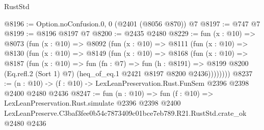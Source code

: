 \begin{lexlean}{RustStd}
\begin{coremodule}
@8196 := Option.noConfusion.{0, 0} (@2401 (@8056 @870)) @7
@8197 := @747 @7
@8199 := @8196 @8197 @7
@8200 := @2435 @2480
@8229 := fun (x : @10) =>
  @8073
    (fun (x : @10) =>
    @8092
      (fun (x : @10) =>
      @8111
        (fun (x : @10) =>
        @8130
          (fun (x : @10) =>
          @8149
            (fun (x : @10) =>
            @8168
              (fun (x : @10) =>
              @8187
                (fun (x : @10) =>
                fun (fn : @7) =>
                fun (h : @8191) =>
                @8199 @8200 (Eq.refl.{2} (Sort 1) @7) (heq_of_eq.{1} @2421 @8197 @8200 @2436))))))))
@8237 := (n : @10) -> (f : @10) -> LexLeanPreservation.Rust.FunSem @2396 @2398 @2400 @2480 @2436
@8247 := fun (n : @10) =>
  fun (f : @10) =>
  LexLeanPreservation.Rust.simulate
    @2396
    @2398
    @2400
    LexLeanPreserve.C3baf3fee0b54c7873409c01bce7eb789.R21.RustStd.crate_ok
    @2480
    @2436
\end{coremodule}
\end{lexlean}

